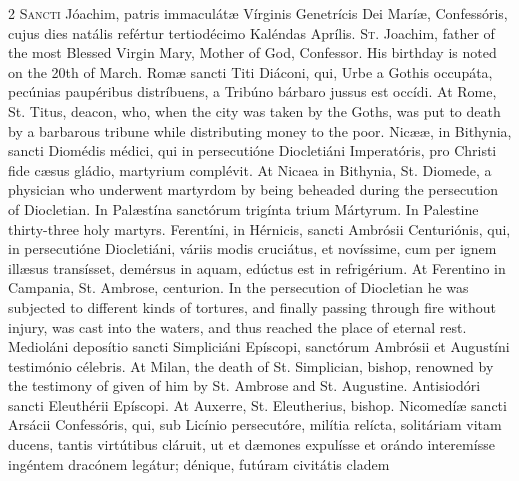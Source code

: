 \begin{paracol}{2}
\lettrine[lines=2]{S}{ancti} Jóachim, patris 
 immaculátæ Vírginis Genetrícis Dei Maríæ, Confessóris, cujus dies natális 
 refértur tertiodécimo Kaléndas Aprílis.
\switchcolumn
{}
\lettrine[lines=2]{S}{t.} Joachim, father of the most 
 Blessed Virgin Mary, Mother of God, Confessor. His birthday is noted 
 on the 20th of March.
\switchcolumn*
{}
Romæ sancti Titi 
 Diáconi, qui, Urbe a Gothis occupáta, pecúnias paupéribus distríbuens, a 
 Tribúno bárbaro jussus est occídi.
\switchcolumn
{}
At Rome, St. Titus, deacon, who, 
 when the city was taken by the Goths, was put to death by a barbarous 
 tribune while distributing money to the poor.
\switchcolumn*
{}
Nicææ, in Bithynia, 
 sancti Diomédis médici, qui in persecutióne Diocletiáni Imperatóris, pro 
 Christi fide cæsus gládio, martyrium complévit.
\switchcolumn
{}
At Nicaea in Bithynia, St. Diomede, 
 a physician who underwent martyrdom by being beheaded during the persecution 
 of Diocletian.
\switchcolumn*
{}
In Palæstína sanctórum 
 trigínta trium Mártyrum.
\switchcolumn
{}
In Palestine thirty-three holy 
 martyrs.
\switchcolumn*
{}
Ferentíni, in Hérnicis, 
 sancti Ambrósii Centuriónis, qui, in persecutióne Diocletiáni, váriis modis 
 cruciátus, et novíssime, cum per ignem illæsus transísset, demérsus in aquam, 
 edúctus est in refrigérium.
\switchcolumn
{}
At Ferentino in Campania, St. 
 Ambrose, centurion. In the persecution of Diocletian he was subjected 
 to different kinds of tortures, and finally passing through fire without 
 injury, was cast into the waters, and thus reached the place of eternal 
 rest.
\switchcolumn*
{}
Medioláni deposítio 
 sancti Simpliciáni Epíscopi, sanctórum Ambrósii et Augustíni testimónio 
 célebris.
\switchcolumn
{}
At Milan, the death of St. 
 Simplician, bishop, renowned by the testimony of given of him by St. Ambrose 
 and St. Augustine.
\switchcolumn*
{}
Antisiodóri sancti 
 Eleuthérii Epíscopi.
\switchcolumn
{}
At Auxerre, St. Eleutherius, bishop.
\switchcolumn*
{}
Nicomedíæ sancti Arsácii 
 Confessóris, qui, sub Licínio persecutóre, milítia relícta, solitáriam vitam 
 ducens, tantis virtútibus cláruit, ut et dæmones expulísse et orándo 
 interemísse ingéntem dracónem legátur; dénique, futúram civitátis cladem 

\end{paracol}
